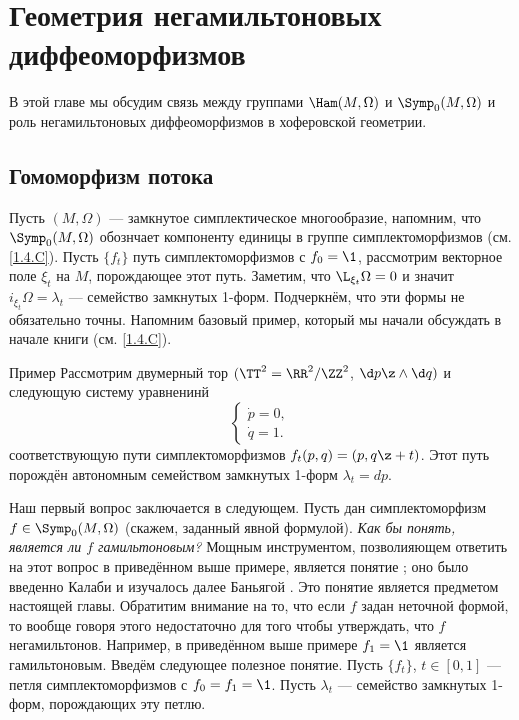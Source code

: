 \chapter[Негамильтоновы диффеоморфизмы]{Геометрия негамильтоновых диффеоморфизмов}\label{chap:14}

В этой главе мы обсудим связь между группами $\Ham(M,\Omega)$ и $\Symp_0(M,\Omega)$ и роль негамильтоновых диффеоморфизмов в хоферовской геометрии.

\section{Гомоморфизм потока}\label{sec:14.1}

Пусть $(M,\Omega)$ --- замкнутое симплектическое многообразие, напомним, что $\Symp_0(M,\Omega)$ обознчает компоненту единицы в группе симплектоморфизмов (см. \ref{1.4.C}).
Пусть $\{f_t\}$  путь симплектоморфизмов с $f_0 = \1$,
рассмотрим векторное поле $\xi_t$ на $M$, порождающее этот путь.
Заметим, что $\L_{\xi_t}\Omega=0$ и значит
$i_{\xi_t}\Omega=\lambda_t$ --- семейство замкнутых 1-форм.
Подчеркнём, что эти формы не обязательно точны.
Напомним базовый пример, который мы начали обсуждать в начале книги (см. \ref{1.4.C}).


\begin{thm}{Пример}\label{14.1.A}
Рассмотрим двумерный тор $(\TT^2=\RR^2/\ZZ^2$, $\d p\z\wedge \d q)$ и следующую систему уравненинй
\[
\begin{cases}
\dot p=0,
\\
\dot q=1.
\end{cases}
\]
соответствующую пути симплектоморфизмов $f_t(p, q) = (p, q \z+ t)$.
Этот путь порождён автономным семейством замкнутых 1-форм $\lambda_t = dp$.
\end{thm}


Наш первый вопрос заключается в следующем.
Пусть дан симплектоморфизм $f\in\Symp_0(M,\Omega)$ (скажем, заданный явной формулой).
\textit{Как бы понять, является ли $f$ гамильтоновым?}
Мощным инструментом, позволияющем ответить на этот вопрос в приведённом выше примере, является понятие ; оно было введенно Калаби и изучалось далее Баньягой \cite{B1}.
Это понятие является предметом настоящей главы.
Обратитим внимание на то, что если $f$ задан неточной формой, то вообще говоря этого недостаточно для того чтобы утверждать, что $f$ негамильтонов.
Например, в приведённом выше примере $f_1 = \1$ является гамильтоновым.
Введём следующее полезное понятие.
Пусть $\{f_t\}$, $t\in[0,1]$ --- петля симплектоморфизмов с $f_0 = f_1 = \1$.
Пусть ${\lambda_t}$ --- семейство замкнутых 1-форм, порождающих эту петлю.

